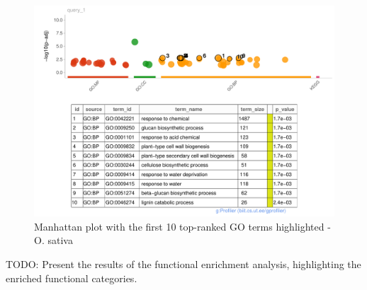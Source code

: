 \begin{figure}[htbp]
    \caption{Manhattan plot with the first 10 top-ranked GO terms highlighted - O. sativa}
    \label{fig:5.2-Gost-Plot-Oryza_sativa}
    \includegraphics[width=\textwidth]{../../results/plots-and-tables/5.2-Gost-Plot-Oryza_sativa}
\end{figure}



TODO: Present the results of the functional enrichment analysis, highlighting the enriched functional categories.